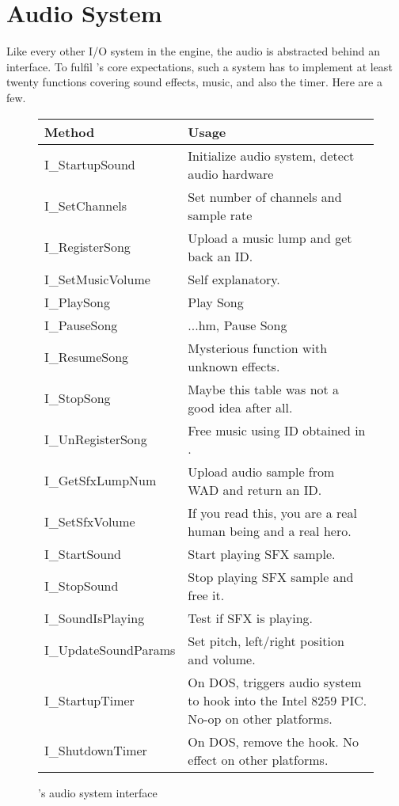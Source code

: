 \section{Audio System}
\label{dmx_section}
Like every other I/O system in the engine, the audio is abstracted behind an interface. To fulfil \doom's core expectations, such a system has to implement at least twenty functions covering sound effects, music, and also the timer. Here are a few.\\
\par
 \begin{figure}[H]
\centering  
\begin{tabularx}{\textwidth}{ L{0.57}  L{1.43}}
  \toprule
  \textbf{Method} &  \textbf{Usage}\\

  \toprule 
  I\_StartupSound & Initialize audio system, detect audio hardware\\
  I\_SetChannels & Set number of channels and sample rate\\
  \toprule 
   
I\_RegisterSong & Upload a music lump and get back an ID.\\
I\_SetMusicVolume & Self explanatory.\\
I\_PlaySong & Play Song\\
I\_PauseSong & ...hm, Pause Song\\
I\_ResumeSong & Mysterious function with unknown effects.\\
I\_StopSong & Maybe this table was not a good idea after all.\\
I\_UnRegisterSong & Free music using ID obtained in .\\




  \toprule 
I\_GetSfxLumpNum & Upload audio sample from WAD and return an ID.\\
I\_SetSfxVolume & If you read this, you are a real human being and a real hero.\\
I\_StartSound & Start playing SFX sample.\\
I\_StopSound & Stop playing SFX sample and free it.\\
I\_SoundIsPlaying & Test if SFX is playing.\\
I\_UpdateSoundParams & Set pitch, left/right position and volume.\\

  \toprule 
  
I\_StartupTimer & On DOS, triggers audio system to hook into the Intel 8259 PIC. No-op on other platforms.\\
I\_ShutdownTimer & On DOS, remove the hook.  No effect on other platforms.\\

   \toprule
\end{tabularx}
\caption{\doom{}'s audio system interface}
\end{figure}



